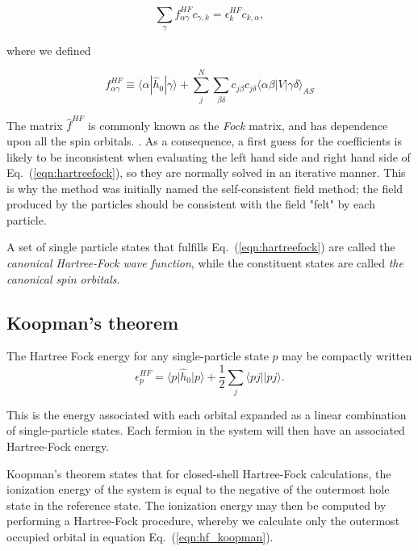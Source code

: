 \begin{equation}
\sum_\gamma f_{\alpha \gamma}^{HF} c_{\gamma,k} = \epsilon_k^{HF} c_{k,\alpha},
\label{eqn:hartreefock}
\end{equation}

where we defined

\begin{equation}
 f_{\alpha \gamma}^{HF}  \equiv   \langle \alpha |\hat{h}_0 | \gamma \rangle + 
\sum_j^N \sum_{\beta \delta}{c_{j \beta} c_{j \delta}  \langle \alpha \beta | V | \gamma \delta \rangle_{AS} } 
 \label{eqn:HF2}
\end{equation}

The matrix $ \hat{f}^{HF} $ is commonly known as the \emph{Fock}
matrix, and has dependence upon all the spin
orbitals. \cite{ShavittBartlett2009}. As a consequence, a first guess
for the coefficients is likely to be inconsistent when evaluating the
left hand side and right hand side of Eq.~(\ref{eqn:hartreefock}), so they
are normally solved in an iterative manner. This is why the method was
initially named the self-consistent field method; the field produced
by the particles should be consistent with the field "felt" by each
particle.

A set of single particle states that fulfills Eq.~(\ref{eqn:hartreefock})
are called the \emph{canonical Hartree-Fock wave function}, while the
constituent states are called \emph{the canonical spin orbitals}.

\subsection{Koopman's theorem}

The Hartree Fock energy for any single-particle state $p$ may be compactly written
\begin{equation}
\epsilon^{HF}_p = \langle p \vert \hat{h}_0 \vert p \rangle + \frac{1}{2} \sum_{j} \langle pj \vert  \vert pj \rangle .
\label{eqn:hf_koopman}
\end{equation}

This is the energy associated with each orbital expanded as a linear combination of single-particle states. Each fermion in the system will then have an associated Hartree-Fock energy.

Koopman's theorem states that for closed-shell Hartree-Fock
calculations, the ionization energy of the system is equal to the
negative of the outermost hole state in the reference state. \cite{Thijssen}
The ionization energy may then be computed by performing a Hartree-Fock procedure, 
whereby we calculate only the outermost occupied
orbital in equation Eq.~(\ref{eqn:hf_koopman}).

